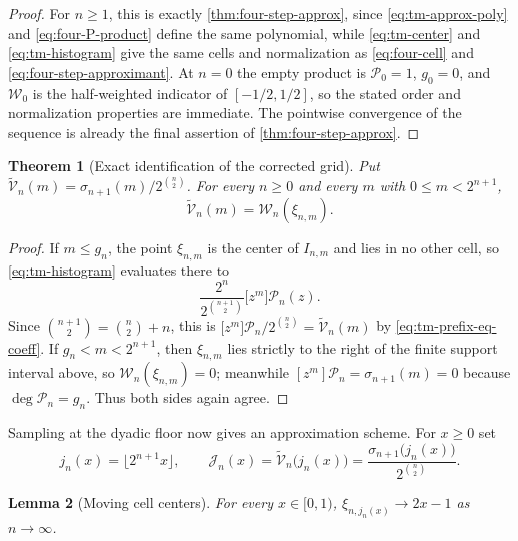 \documentclass[11pt,oneside]{article}
\newtheorem{theorem}{Theorem}[section]
\newtheorem{lemma}[theorem]{Lemma}
\theoremstyle{definition}
\theoremstyle{remark}
\begin{document}
\begin{proof}
For $n\ge1$, this is exactly \cref{thm:four-step-approx}, since
\eqref{eq:tm-approx-poly} and \eqref{eq:four-P-product} define the same polynomial, while
\eqref{eq:tm-center} and \eqref{eq:tm-histogram} give the same cells and normalization as
\eqref{eq:four-cell} and \eqref{eq:four-step-approximant}.  At $n=0$ the empty product is
$\mathcal P_0=1$, $g_0=0$, and $\mathcal W_0$ is the half-weighted indicator of
$[-1/2,1/2]$, so the stated order and normalization properties are immediate.  The
pointwise convergence of the sequence is already the final assertion of
\cref{thm:four-step-approx}.
\end{proof}

\begin{theorem}[Exact identification of the corrected grid]
\label{thm:tm-histogram-identity}
Put $\widetilde{\mathcal V}_n(m)=\sigma_{n+1}(m)/2^{\binom n2}$.  For every $n\ge0$ and
every $m$ with $0\le m<2^{n+1}$,
\begin{equation}
 \widetilde{\mathcal V}_n(m)=\mathcal W_n(\xi_{n,m}).          \label{eq:tm-grid-eq-histogram}
\end{equation}
\end{theorem}

\begin{proof}
If $m\le g_n$, the point $\xi_{n,m}$ is the center of $I_{n,m}$ and lies in no other cell,
so \eqref{eq:tm-histogram} evaluates there to
\begin{equation*}
 \frac{2^{n}}{2^{\binom{n+1}2}}\bigl[z^m\bigr]\mathcal P_n(z).
\end{equation*}
Since $\binom{n+1}2=\binom n2+n$, this is
$\bigl[z^m\bigr]\mathcal P_n/2^{\binom n2}=\widetilde{\mathcal V}_n(m)$ by
\eqref{eq:tm-prefix-eq-coeff}.  If $g_n<m<2^{n+1}$, then $\xi_{n,m}$ lies strictly to the
right of the finite support interval above, so $\mathcal W_n(\xi_{n,m})=0$; meanwhile
$[z^m]\mathcal P_n=\sigma_{n+1}(m)=0$ because $\deg\mathcal P_n=g_n$.  Thus both sides
again agree.
\end{proof}

Sampling at the dyadic floor now gives an approximation scheme.  For $x\ge0$ set
\begin{equation}
 j_n(x)=\bigl\lfloor2^{n+1}x\bigr\rfloor,
 \qquad
 \mathcal J_n(x)=\widetilde{\mathcal V}_n\bigl(j_n(x)\bigr)
 =\frac{\sigma_{n+1}\bigl(j_n(x)\bigr)}{2^{\binom n2}}.    \label{eq:tm-sample}
\end{equation}

\begin{lemma}[Moving cell centers]
\label{thm:tm-moving-center}
For every $x\in[0,1)$, $\xi_{n,j_n(x)}\to2x-1$ as $n\to\infty$.
\end{lemma}
\end{document}
